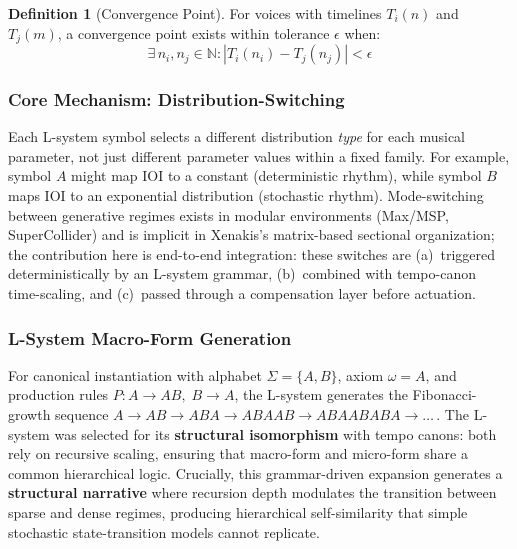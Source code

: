 \documentclass[a4paper]{article}
\theoremstyle{definition}
\newtheorem{definition}{Definition}
\theoremstyle{remark}
\begin{document}
\begin{definition}[Convergence Point]
\label{def:cp}
For voices with timelines $T_i(n)$ and $T_j(m)$, a convergence point exists within tolerance $\epsilon$ when:
\begin{equation}
    \exists \, n_i, n_j \in \mathbb{N} : |T_i(n_i) - T_j(n_j)| < \epsilon
\end{equation}
\end{definition}

\subsubsection{Core Mechanism: Distribution-Switching}

Each L-system symbol selects a different distribution \emph{type} for each musical parameter, not just different parameter values within a fixed family. For example, symbol $A$ might map IOI to a constant (deterministic rhythm), while symbol $B$ maps IOI to an exponential distribution (stochastic rhythm). Mode-switching between generative regimes exists in modular environments (Max/MSP, SuperCollider) and is implicit in Xenakis's matrix-based sectional organization; the contribution here is end-to-end integration: these switches are (a)~triggered deterministically by an L-system grammar, (b)~combined with tempo-canon time-scaling, and (c)~passed through a compensation layer before actuation.

\subsubsection{L-System Macro-Form Generation}

For canonical instantiation with alphabet $\Sigma = \{A, B\}$, axiom $\omega = A$, and production rules $P: A \rightarrow AB, \; B \rightarrow A$, the L-system generates the Fibonacci-growth sequence $A \rightarrow AB \rightarrow ABA \rightarrow ABAAB \rightarrow ABAABABA \rightarrow \ldots$\,. The L-system was selected for its \textbf{structural isomorphism} with tempo canons: both rely on recursive scaling, ensuring that macro-form and micro-form share a common hierarchical logic. Crucially, this grammar-driven expansion generates a \textbf{structural narrative} where recursion depth modulates the transition between sparse and dense regimes, producing hierarchical self-similarity that simple stochastic state-transition models cannot replicate.
\end{document}
